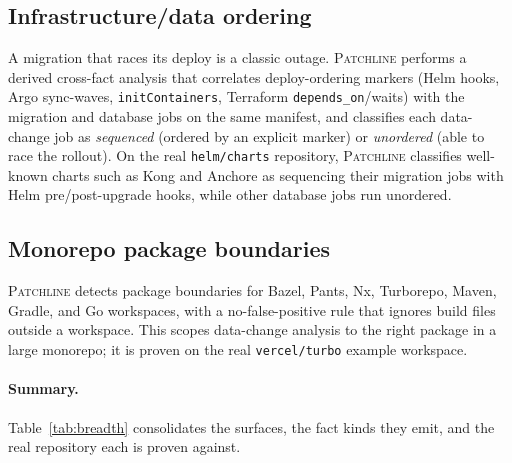 \documentclass[11pt]{article}
\newcommand{\tool}{\textsc{Patchline}}
\newcommand{\code}[1]{\texttt{#1}}
\begin{document}
\subsection{Infrastructure/data ordering}
A migration that races its deploy is a classic outage. \tool{} performs a derived cross-fact analysis
that correlates deploy-ordering markers (Helm hooks, Argo sync-waves, \code{initContainers},
Terraform \code{depends\_on}/waits) with the migration and database jobs on the same manifest, and
classifies each data-change job as \emph{sequenced} (ordered by an explicit marker) or
\emph{unordered} (able to race the rollout). On the real \code{helm/charts} repository, \tool{}
classifies well-known charts such as Kong and Anchore as sequencing their migration jobs with Helm
pre/post-upgrade hooks, while other database jobs run unordered.

\subsection{Monorepo package boundaries}
\tool{} detects package boundaries for Bazel, Pants, Nx, Turborepo, Maven, Gradle, and Go workspaces,
with a no-false-positive rule that ignores build files outside a workspace. This scopes data-change
analysis to the right package in a large monorepo; it is proven on the real \code{vercel/turbo}
example workspace.

\paragraph{Summary.} Table~\ref{tab:breadth} consolidates the surfaces, the fact kinds they emit, and
the real repository each is proven against.
\end{document}
